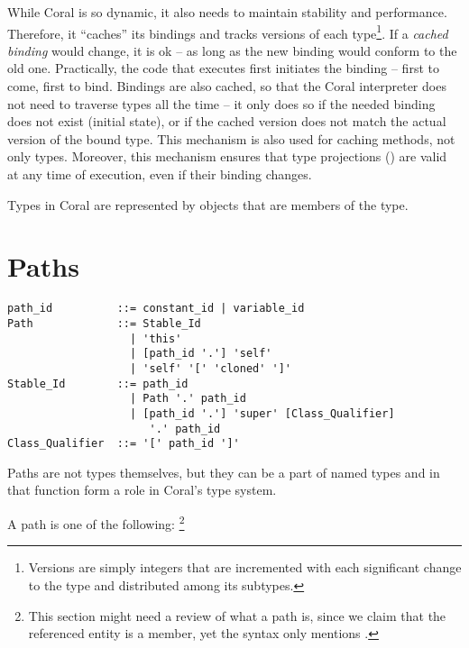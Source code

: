 While Coral is so dynamic, it also needs to maintain stability and performance. Therefore, it ``caches'' its bindings and tracks versions of each type\footnote{Versions are simply integers that are incremented with each significant change to the type and distributed among its subtypes.}. If a \textit{cached binding} would change, it is ok -- as long as the new binding would conform to the old one. Practically, the code that executes first initiates the binding -- first to come, first to bind. Bindings are also cached, so that the Coral interpreter does not need to traverse types all the time -- it only does so if the needed binding does not exist (initial state), or if the cached version does not match the actual version of the bound type. This mechanism is also used for caching methods, not only types. Moreover, this mechanism ensures that type projections () are valid at any time of execution, even if their binding changes. 

Types in Coral are represented by objects that are members of the  type. 






\section{Paths}
\label{sec:type-paths}

\syntax\begin{lstlisting}
path_id          ::= constant_id | variable_id
Path             ::= Stable_Id
                   | 'this'
                   | [path_id '.'] 'self'
                   | 'self' '[' 'cloned' ']'
Stable_Id        ::= path_id
                   | Path '.' path_id
                   | [path_id '.'] 'super' [Class_Qualifier] 
                      '.' path_id
Class_Qualifier  ::= '[' path_id ']'
\end{lstlisting}

Paths are not types themselves, but they can be a part of named types and in that function form a role in Coral's type system. 

A path is one of the following: \footnote{This section might need a review of what a path is, since we claim that the referenced entity is a member, yet the syntax only mentions .}

